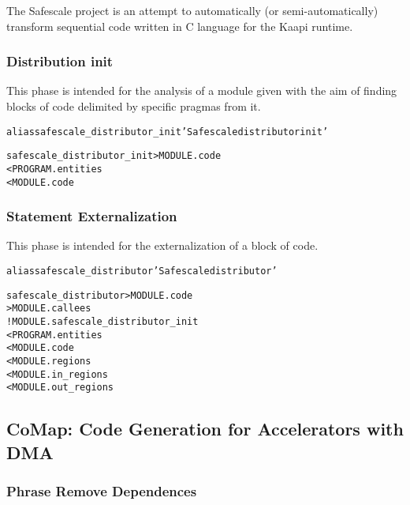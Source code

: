 \documentclass[a4paper]{report}
\newenvironment{PipsMake}{\begin{alltt}}{\end{alltt}}
\newenvironment{PipsPass}[1]{\label{pass:#1}}{}
\begin{document}
The Safescale project is an attempt to automatically (or semi-automatically)
transform sequential code written in C language for the Kaapi runtime.

\subsubsection{Distribution init}

\begin{PipsPass}{saferscale_distributor_init}
This phase is intended for the analysis of a module given with the aim of finding
blocks of code delimited by specific pragmas from it.
\end{PipsPass}

\begin{PipsMake}
alias safescale_distributor_init 'Safescale distributor init'

safescale_distributor_init                  > MODULE.code
        < PROGRAM.entities
        < MODULE.code
\end{PipsMake}

\subsubsection{Statement Externalization}

\begin{PipsPass}{safescale_distributor}
This phase is intended for the externalization of a block of code.
\end{PipsPass}

\begin{PipsMake}
alias safescale_distributor 'Safescale distributor'

safescale_distributor                  > MODULE.code
                                       > MODULE.callees
        ! MODULE.safescale_distributor_init
        < PROGRAM.entities
        < MODULE.code
        < MODULE.regions
        < MODULE.in_regions
        < MODULE.out_regions
\end{PipsMake}

\subsection{CoMap: Code Generation for Accelerators with DMA}
\label{sec:comap:-code}

\subsubsection{Phrase Remove Dependences}
\end{document}
